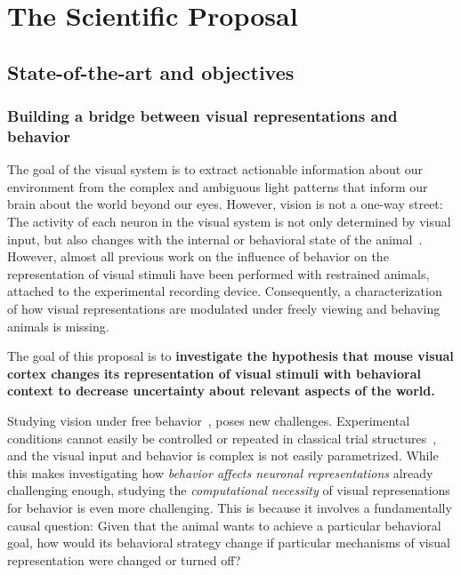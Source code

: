 \documentclass[B2,COG]{ercgrant}
\begin{document}
\maketitle



\chapter{The Scientific Proposal}


\section{State-of-the-art and objectives}\label{sec:stateofart}
\subsection{Building a bridge between visual representations and behavior}
The goal of the visual system is to extract actionable information about our environment from the complex and ambiguous light patterns that inform our brain about the world beyond our eyes.
However, vision is not a one-way street: The activity of each neuron in the visual system is not only determined by visual input, but also changes with the internal or behavioral state of the animal~\parencite{Niell2010-bs, Musall2019-kd, Erisken2014-un, Franke2022-do}. 
However, almost all previous work on the influence of behavior on the representation
of visual stimuli have been performed with restrained animals, attached to the experimental recording device.
Consequently, a characterization of how visual representations are modulated under freely viewing and behaving animals is missing. 

The goal of this proposal is to \textbf{investigate the hypothesis that mouse visual cortex changes its representation of visual stimuli with behavioral context to decrease uncertainty about relevant aspects of the world.} 

Studying vision under free behavior~\parencite{Parker2022-ac}, poses new challenges. 
Experimental conditions cannot easily be controlled or repeated in classical trial structures~\parencite{Huk2018-ez}, and the visual input and behavior is complex is not easily parametrized. 
While this makes investigating how \textit{behavior affects neuronal representations} already challenging enough, studying the \textit{computational necessity} of visual represenations for behavior is even more challenging.
This is because it involves a fundamentally causal question: Given that the animal wants to achieve a particular behavioral goal, how would its behavioral strategy change if particular mechanisms of visual representation were changed or turned off?
\end{document}
